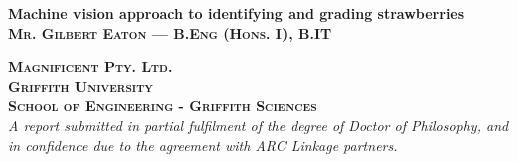\documentclass[fleqn,twoside,12pt]{report}
\begin{document}
\raggedbottom

\begin{titlepage}


\newcommand{\HRule}{\rule{\linewidth}{0.5mm}} %
 
\begin{flushleft} 
 



{ \Huge \bfseries Machine vision approach to identifying and grading strawberries}\\[1.5cm] %


\textsc{\Large \bfseries Mr. Gilbert Eaton --- B.Eng (Hons. I), B.IT}\\[0.5cm] %
 
 
 
\vspace{10mm} 



\textsc{\Large \bfseries Magnificent Pty. Ltd.}\\[0.5cm] %
\textsc{\Large \bfseries Griffith University}\\[0.5cm] %
\textsc{\Large \bfseries School of Engineering - Griffith Sciences}\\[1.5cm] %



\emph{A report submitted in partial fulfilment of the degree of Doctor of Philosophy, and in confidence due to the agreement with ARC Linkage partners.}\\[1.5cm]




\end{flushleft}

\vfill %

\end{titlepage}
\end{document}
